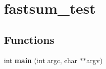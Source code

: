 \hypertarget{group__applications__fastsum__test}{
\section{fastsum\_\-test}
\label{group__applications__fastsum__test}
}
\subsection*{Functions}
\begin{CompactItemize}
\item 
\hypertarget{group__applications__fastsum__test_ga0}{
int {\bf main} (int argc, char $\ast$$\ast$argv)}
\label{group__applications__fastsum__test_ga0}

\end{CompactItemize}
